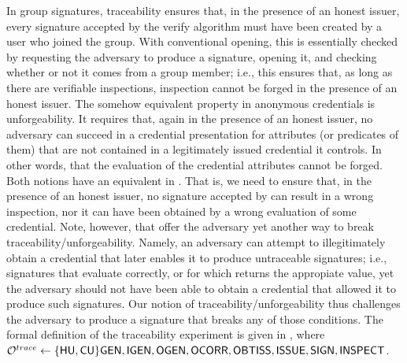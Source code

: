 In group signatures, traceability ensures that, in the presence of an honest
issuer, every signature accepted by the verify algorithm must have been created
by a user who joined the group.  With conventional opening, this is essentially
checked by requesting the adversary to produce a signature, opening it, and
checking whether or not it comes from a group member; i.e., this ensures that,
as long as there are verifiable inspections, inspection cannot be forged in the
presence of an honest issuer.
%
The somehow equivalent property in anonymous credentials is unforgeability. It
requires that, again in the presence of an honest issuer, no adversary can
succeed in a credential presentation for attributes (or predicates of them) that
are not contained in a legitimately issued credential it controls. In other
words, that the evaluation of the credential attributes cannot be forged.
%
Both notions have an equivalent in \UAS. That is, we need to ensure that, in the
presence of an honest issuer, no signature accepted by \Verify can result in a
wrong inspection, nor it can have been obtained by a wrong evaluation of some
credential. Note, however, that \UAS offer the adversary yet another way to
break traceability/unforgeability. Namely, an adversary can attempt to
illegitimately obtain a credential that later enables it to produce untraceable
signatures; i.e., signatures that evaluate correctly, or for which \Inspect
returns the appropiate value, yet the adversary should not have been able to
obtain a credential that allowed it to produce such signatures. Our notion of
traceability/unforgeability thus challenges the adversary to produce a signature
that breaks any of those conditions. The formal
definition of the traceability experiment is given in ,
where $\mathcal{O}^{trace} \gets \lbrace\mathsf{HU},\mathsf{CU}\rbrace\mathsf{GEN},\mathsf{IGEN},\mathsf{OGEN},\mathsf{OCORR},\mathsf{OBTISS},
\mathsf{ISSUE},\mathsf{SIGN},\mathsf{INSPECT}$.

